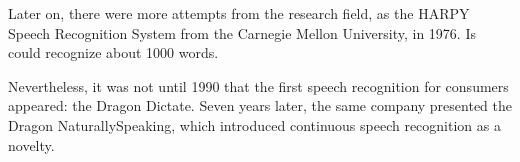 Later on, there were more attempts from the research field, as the HARPY Speech Recognition System from the Carnegie
Mellon University, in 1976.\cite{lowerre76} Is could recognize about 1000 words.

Nevertheless, it was not until 1990 that the first speech recognition for consumers appeared: the Dragon Dictate. Seven years
later, the same company presented the Dragon NaturallySpeaking, which introduced continuous speech recognition as a novelty.






